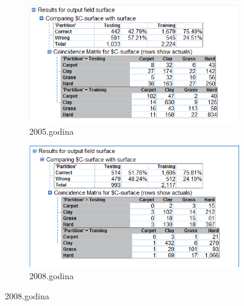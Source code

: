 \documentclass[a4paper]{article}
\begin{document}
\begin{figure}[H]
	\begin{subfigure}[h]{0.35\textwidth}
		\begin{center}
			\includegraphics[scale=0.50]{Klasifikacija/C50/Analysis_Surface2005.png}
		\end{center}
		\caption{2005.godina}
		\label{fig:MatricaKnfuzijeC502005}
	\end{subfigure}
	\hspace{2.5cm}
	\begin{subfigure}[h]{0.35\textwidth}
		\begin{center}
			\includegraphics[scale=0.45]{Klasifikacija/C50/Analysis_Surface2008.png}
		\end{center}
		\caption{2008.godina}
		\label{fig:MatricaKnfuzijeC502008}
	\end{subfigure}
	

\end{figure}
\end{document}
